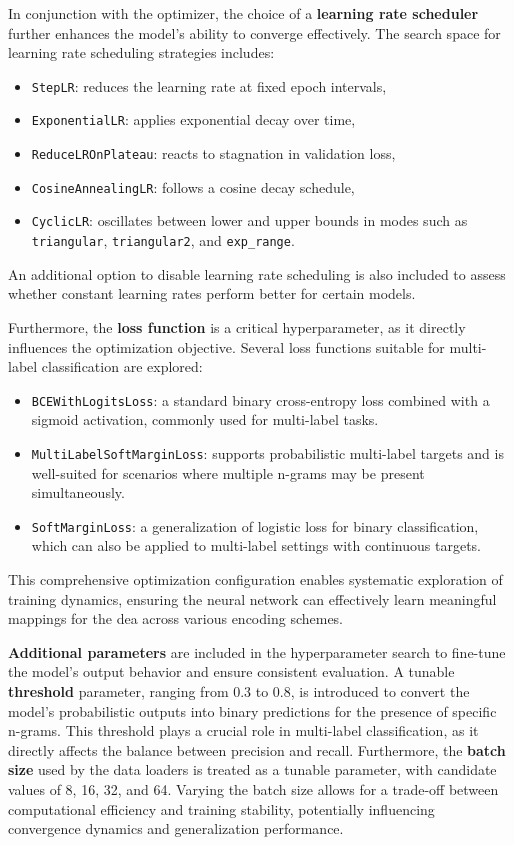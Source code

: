 In conjunction with the optimizer, the choice of a \textbf{learning rate scheduler} further enhances the model's ability to converge effectively.
The search space for learning rate scheduling strategies includes:
\begin{itemize}
    \item \texttt{StepLR}: reduces the learning rate at fixed epoch intervals,
    \item \texttt{ExponentialLR}: applies exponential decay over time,
    \item \texttt{ReduceLROnPlateau}: reacts to stagnation in validation loss,
    \item \texttt{CosineAnnealingLR}: follows a cosine decay schedule,
    \item \texttt{CyclicLR}: oscillates between lower and upper bounds in modes such as \texttt{triangular}, \texttt{triangular2}, and \texttt{exp\_range}.
\end{itemize}
An additional option to disable learning rate scheduling is also included to assess whether constant learning rates perform better for certain models.

Furthermore, the \textbf{loss function} is a critical hyperparameter, as it directly influences the optimization objective.
Several loss functions suitable for multi-label classification are explored:
\begin{itemize}
    \item \texttt{BCEWithLogitsLoss}: a standard binary cross-entropy loss combined with a sigmoid activation, commonly used for multi-label tasks.
    \item \texttt{MultiLabelSoftMarginLoss}: supports probabilistic multi-label targets and is well-suited for scenarios where multiple n-grams may be present simultaneously.
    \item \texttt{SoftMarginLoss}: a generalization of logistic loss for binary classification, which can also be applied to multi-label settings with continuous targets.
\end{itemize}

This comprehensive optimization configuration enables systematic exploration of training dynamics, ensuring the neural network can effectively learn meaningful mappings for the \ac{dea} across various encoding schemes.

\textbf{Additional parameters} are included in the hyperparameter search to fine-tune the model's output behavior and ensure consistent evaluation.
A tunable \textbf{threshold} parameter, ranging from 0.3 to 0.8, is introduced to convert the model’s probabilistic outputs into binary predictions for the presence of specific n-grams.
This threshold plays a crucial role in multi-label classification, as it directly affects the balance between precision and recall.
Furthermore, the \textbf{batch size} used by the data loaders is treated as a tunable parameter, with candidate values of 8, 16, 32, and 64. Varying the batch size allows for a trade-off between computational efficiency and training stability, potentially influencing convergence dynamics and generalization performance.


